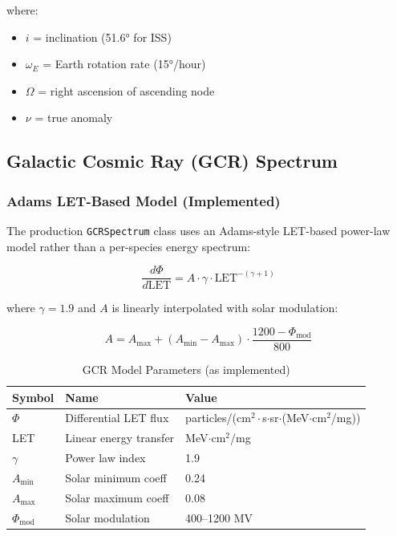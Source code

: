 \documentclass[11pt,a4paper]{article}
\begin{document}
where:
\begin{itemize}
    \item $i$ = inclination (51.6° for ISS)
    \item $\omega_E$ = Earth rotation rate (15°/hour)
    \item $\Omega$ = right ascension of ascending node
    \item $\nu$ = true anomaly
\end{itemize}

\subsection{Galactic Cosmic Ray (GCR) Spectrum}

\subsubsection{Adams LET-Based Model (Implemented)}

The production \texttt{GCRSpectrum} class uses an Adams-style LET-based power-law model rather than a per-species energy spectrum:

\begin{equation}
\frac{d\Phi}{d\text{LET}} = A \cdot \gamma \cdot \text{LET}^{-(\gamma+1)}
\end{equation}

where $\gamma = 1.9$ and $A$ is linearly interpolated with solar modulation:

\begin{equation}
A = A_{\max} + (A_{\min} - A_{\max}) \cdot \frac{1200 - \Phi_{\text{mod}}}{800}
\end{equation}

\begin{table}[htbp]
\centering
\caption{GCR Model Parameters (as implemented)}
\begin{tabular}{@{}lll@{}}
\toprule
\textbf{Symbol} & \textbf{Name} & \textbf{Value} \\ \midrule
$\Phi$ & Differential LET flux & particles/(cm$^2\cdot$s$\cdot$sr$\cdot$(MeV$\cdot$cm$^2$/mg)) \\
LET & Linear energy transfer & MeV$\cdot$cm$^2$/mg \\
$\gamma$ & Power law index & 1.9 \\
$A_{\min}$ & Solar minimum coeff & 0.24 \\
$A_{\max}$ & Solar maximum coeff & 0.08 \\
$\Phi_{\text{mod}}$ & Solar modulation & 400--1200 MV \\ \bottomrule
\end{tabular}
\end{table}
\end{document}
